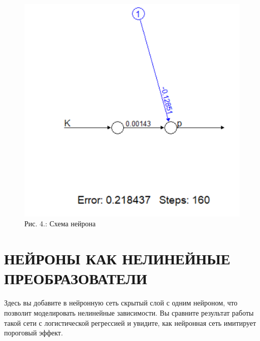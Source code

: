 \documentclass[
  letterpaper,
  DIV=11,
  numbers=noendperiod]{scrreprt}
\begin{document}
\begin{figure}[H]

{\centering \includegraphics[width=0.4\linewidth,height=\textheight,keepaspectratio]{images/KOROSOV4.PNG}

}

\caption{Рис. 4.: Схема нейрона}

\end{figure}%

\section{НЕЙРОНЫ КАК НЕЛИНЕЙНЫЕ
ПРЕОБРАЗОВАТЕЛИ}\label{ux43dux435ux439ux440ux43eux43dux44b-ux43aux430ux43a-ux43dux435ux43bux438ux43dux435ux439ux43dux44bux435-ux43fux440ux435ux43eux431ux440ux430ux437ux43eux432ux430ux442ux435ux43bux438}

Здесь вы добавите в нейронную сеть скрытый слой с одним нейроном, что
позволит моделировать нелинейные зависимости. Вы сравните результат
работы такой сети с логистической регрессией и увидите, как нейронная
сеть имитирует пороговый эффект.
\end{document}
